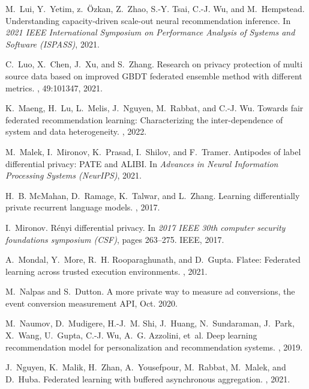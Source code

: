 \documentclass{article}
\begin{document}
\begin{thebibliography}{10}
M.~Lui, Y.~Yetim, z.~Özkan, Z.~Zhao, S.-Y. Tsai, C.-J. Wu, and M.~Hempstead.
\newblock Understanding capacity-driven scale-out neural recommendation
  inference.
\newblock In {\em 2021 IEEE International Symposium on Performance Analysis of
  Systems and Software (ISPASS)}, 2021.

C.~Luo, X.~Chen, J.~Xu, and S.~Zhang.
\newblock Research on privacy protection of multi source data based on improved
  {GBDT} federated ensemble method with different metrics.
, 49:101347, 2021.

K.~Maeng, H.~Lu, L.~Melis, J.~Nguyen, M.~Rabbat, and C.-J. Wu.
\newblock Towards fair federated recommendation learning: Characterizing the
  inter-dependence of system and data heterogeneity.
, 2022.

M.~Malek, I.~Mironov, K.~Prasad, I.~Shilov, and F.~Tramer.
\newblock Antipodes of label differential privacy: {PATE} and {ALIBI}.
\newblock In {\em Advances in Neural Information Processing Systems (NeurIPS)},
  2021.

H.~B. McMahan, D.~Ramage, K.~Talwar, and L.~Zhang.
\newblock Learning differentially private recurrent language models.
, 2017.

I.~Mironov.
\newblock R{\'e}nyi differential privacy.
\newblock In {\em 2017 IEEE 30th computer security foundations symposium
  (CSF)}, pages 263--275. IEEE, 2017.

A.~Mondal, Y.~More, R.~H. Rooparaghunath, and D.~Gupta.
\newblock Flatee: Federated learning across trusted execution environments.
, 2021.

M.~Nalpas and S.~Dutton.
\newblock A more private way to measure ad conversions, the event conversion
  measurement {API}, Oct. 2020.

M.~Naumov, D.~Mudigere, H.-J.~M. Shi, J.~Huang, N.~Sundaraman, J.~Park,
  X.~Wang, U.~Gupta, C.-J. Wu, A.~G. Azzolini, et~al.
\newblock Deep learning recommendation model for personalization and
  recommendation systems.
, 2019.

J.~Nguyen, K.~Malik, H.~Zhan, A.~Yousefpour, M.~Rabbat, M.~Malek, and D.~Huba.
\newblock Federated learning with buffered asynchronous aggregation.
, 2021.


\end{thebibliography}
\end{document}
